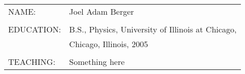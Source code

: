 \vita

\begin{center}
\begin{singlespace}

\vspace{0.4in}

\begin{tabular}{lp{4.5in}}
NAME: & Joel Adam Berger \\
\\
EDUCATION: & B.S., Physics, University of Illinois at Chicago,\\
& Chicago, Illinois, 2005 \\
\\
TEACHING: & Something here\\
\end{tabular}

\end{singlespace}
\end{center}

